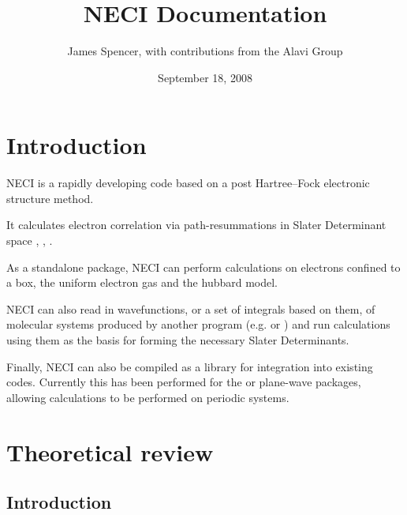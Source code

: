 \documentclass[openany,a4paper,10pt]{manual}
\title{NECI Documentation}
\date{September 18, 2008}
\author{James Spencer, with contributions from the Alavi Group}
\begin{document}
\maketitle
\tableofcontents



\resetcurrentobjects


\hypertarget{introduction}{}\chapter{Introduction}

NECI is a rapidly developing code based on a post Hartree--Fock electronic structure method.

It calculates electron correlation via path-resummations in Slater Determinant space \cite{SumPaper}, \cite{StarPaper}, \cite{ThomPhDThesis}.

As a standalone package, NECI can perform calculations on electrons confined to a box, the uniform electron gas and the hubbard model.

NECI can also read in wavefunctions, or a set of integrals based on them, of molecular systems produced by another program (e.g. \cite{DALTON} or \cite{MolPro}) and run calculations using them as the basis for forming the necessary Slater Determinants.

Finally, NECI can also be compiled as a library for integration into existing codes.  Currently this has been performed for the \cite{CPMD} or \cite{VASP} plane-wave packages, allowing calculations to be performed on periodic systems.

\resetcurrentobjects


\hypertarget{theory-index}{}\chapter{Theoretical review}

\resetcurrentobjects


\hypertarget{theory-introduction}{}\section{Introduction}
\end{document}
